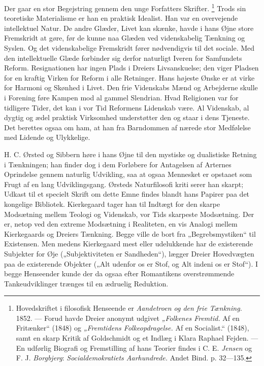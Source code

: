 \documentclass[12pt,a4paper,openany]{book}
\newcommand{\opage}[1]{\marginnote{\footnotesize\textit{[#1]}}}
\begin{document}
Der gaar en stor Begejstring gennem den unge Forfatters Skrifter.%
\footnote[1]{Hovedskriftet i filosofisk Henseende er \textit{Aandetroen og den
frie Tænkning.} 1852. --- Forud havde Dreier anonymt udgivet \textit{„Folkenes
Fremtid.} Af en Fritænker“ (1848) og \textit{„Fremtidens Folkeopdragelse.} Af
en Socialist.“ (1848), samt en skarp Kritik af Goldschmidt og et Indlæg i Klara
Raphael Fejden. --- En udførlig Biografi og Fremstilling af hans Teorier findes
i C. E. \emph{Jensen} og F. J. \emph{Borgbjerg}: \textit{Socialdemokratiets
Aarhundrede.} Andet Bind. p. 32---135.} Trods sin teoretiske Materialisme er
han en praktisk Idealist. Han var en overvejende intellektuel Natur. De andre
Glæder, Livet kan skænke, havde i hans Øjne store Fremskridt at gøre, før de
kunne naa Glæden ved videnskabelig Tænkning og Syslen. Og det videnskabelige
Fremskridt fører nødvendigvis til det sociale. Med den intellektuelle Glæde
forbinder sig derfor naturligt Iveren for Samfundets Reform. Resignationen har
ingen Plads i Dreiers Livsanskuelse; den viger Pladsen for en kraftig Virken
for Reform i alle Retninger. Hans højeste Ønske er at virke for Harmoni og
Skønhed i Livet. Den frie Videnskabs Mænd og Arbejderne skulle i Forening føre
Kampen mod al gammel Slendrian. Hvad Religionen var for tidligere Tider, det
kan i vor Tid Reformens Lidenskab være. Al Videnskab, al dygtig og ædel
praktisk Virksomhed understøtter den og staar i dens Tjeneste. Det berettes
ogsaa om ham, at han fra Barndommen af nærede stor Medfølelse med Lidende og
Ulykkelige.

H. C. Ørsted og Sibbern høre i hans Øjne til den mystiske og dualistiske
Retning i Tænkningen; han finder dog i dem Forløbere for Antagelsen af Arternes
Oprindelse gennem naturlig Udvikling, saa at ogsaa Mennesket er opstaaet som
Frugt af en lang Udviklingsgang. Ørsteds Naturfilosofi kriti%
\setcounter{footnote}{0}%
\opage{177}serer han skarpt; Udkast til et specielt Skrift om dette Emne findes
blandt hans Papirer paa det kongelige Bibliotek. Kierkegaard tager han til
Indtægt for den skarpe Modsætning mellem Teologi og Videnskab, vor Tids
skarpeste Modsætning. Der er, netop ved den extreme Modsætning i Realiteten, en
vis Analogi mellem Kierkegaards og Dreiers Tænkning. Begge ville de bort fra
„Begrebsmystiken“ til Existensen. Men medens Kierkegaard mest eller udelukkende
har de existerende Subjekter for Øje („Subjektiviteten er Sandheden“), lægger
Dreier Hovedvægten paa de existerende Objekter („Alt udenfor os er Stof, og Alt
indeni os er Stof“). I begge Henseender kunde der da ogsaa efter Romantikens
overstrømmende Tankeudviklinger trænges til en ædruelig Reduktion.
\end{document}
